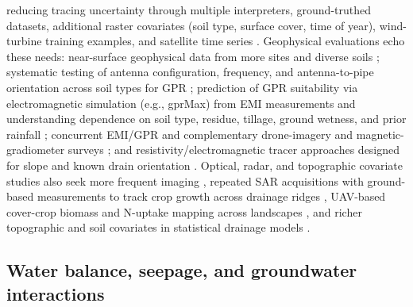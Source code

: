 reducing tracing uncertainty through multiple interpreters, ground-truthed
datasets, additional raster covariates (soil type, surface cover, time of year),
wind-turbine training examples, and satellite time series \parencite{Redoloza2023}.
Geophysical evaluations echo these needs: near-surface geophysical data from more
sites and diverse soils \parencite{Allred2005}; systematic testing of antenna
configuration, frequency, and antenna-to-pipe orientation across soil types for
GPR \parencite{Allred2013}; prediction of GPR suitability via electromagnetic
simulation (e.g., gprMax) from EMI measurements and understanding dependence on
soil type, residue, tillage, ground wetness, and prior rainfall
\parencite{Koganti2020,Koganti2021}; concurrent EMI/GPR and complementary
drone-imagery and magnetic-gradiometer surveys \parencite{Koganti2020}; and
resistivity/electromagnetic tracer approaches designed for slope and known drain
orientation \parencite{Jouen2018}. Optical, radar, and topographic covariate
studies also seek more frequent imaging \parencite{Tlapáková2017}, repeated SAR
acquisitions with ground-based measurements to track crop growth across drainage
ridges \parencite{Meunier2001}, UAV-based cover-crop biomass and N-uptake mapping
across landscapes \parencite{Xu2018}, and richer topographic and soil covariates
in statistical drainage models \parencite{Harris2018}.

\subsection{Water balance, seepage, and groundwater interactions}

